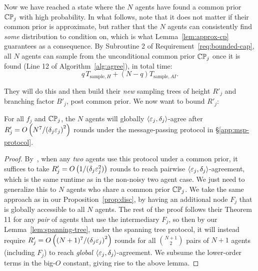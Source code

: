 Now we have reached a state where the $N$ agents have found a common prior $\mathbb{C}\mathbb{P}_j$ with high probability.
In what follows, note that it does not matter if their common prior is approximate, but rather that the $N$ agents can consistently find \emph{some} distribution to condition on, which is what Lemma~\ref{lem:approx-cp} guarantees as a consequence.
By Subroutine 2 of Requirement~\ref{req:bounded-cap}, all $N$ agents can sample from the unconditional common prior $\mathbb{C}\mathbb{P}_j$ once it is found (Line 12 of Algorithm~\ref{alg:agree}), in total time:
\begin{equation}\label{eq:cond-time}
q\,T_{\text{sample},H}+(N-q)T_{\text{sample},AI}.
\end{equation}

They will do this and then build their \emph{new} sampling trees of height $R'_j$ and branching factor $B'_j$, post common prior.
We now want to bound $R'_j$:
\begin{lemma}\label{lem:agree-smoothed-standard}
For all $f_j$ and $\mathbb{C}\mathbb{P}_j$, the $N$ agents will globally $\left \langle \varepsilon_j, \delta_j \right \rangle $-agree after $R'_j = O\left({N^7}/{\left(\delta_j\varepsilon_j\right)^2}\right)$ rounds under the message-passing protocol in \S\ref{app:msp-protocol}.
\end{lemma}
\begin{proof}
By~\citep[Theorem 11]{aaronson2005complexity}, when any \emph{two} agents use this protocol under a common prior, it suffices to take $R'_j = O\left(1/(\delta_j\varepsilon_j^2)\right)$ rounds to reach pairwise $\left \langle \varepsilon_j, \delta_j \right \rangle $-agreement, which is the same runtime as in the non-noisy two agent case.
We just need to generalize this to $N$ agents who share a common prior $\mathbb{C}\mathbb{P}_j$.
We take the same approach as in our Proposition~\ref{prop:disc}, by having an additional node $F_j$ that is globally accessible to all $N$ agents.
The rest of the proof follows their Theorem 11 for any \emph{pair} of agents that use the intermediary $F_j$, so then by our Lemma~\ref{lem:spanning-tree}, under the spanning tree protocol, it will instead require $R'_j = O\left({(N+1)^7}/{\left(\delta_j\varepsilon_j\right)^2}\right)$ rounds for all $\binom{N+1}{2}$ pairs of $N+1$ agents (including $F_j$) to reach \emph{global} $\left \langle \varepsilon_j, \delta_j \right \rangle $-agreement.
We subsume the lower-order terms in the big-$O$ constant, giving rise to the above lemma.
\end{proof}

